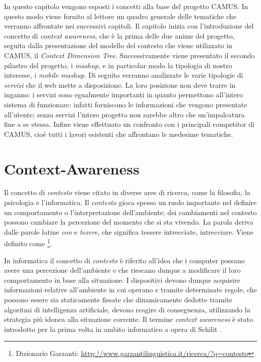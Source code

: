 In questo capitolo vengono esposti i concetti alla base del progetto CAMUS. In questo modo viene fornito al lettore un quadro generale delle tematiche che verranno affrontate nei successivi capitoli. Il capitolo inizia con l'introduzione del concetto di \emph{context awareness}, che è la prima delle due anime del progetto, seguita dalla presentazione del modello del contesto che viene utilizzato in CAMUS, il \emph{Context Dimension Tree}. Successivamente viene presentato il secondo pilastro del progetto, i \emph{mashup}, e in particolar modo la tipologia di nostro interesse, i \emph{mobile mashup}. Di seguito verranno analizzate le varie tipologie di \emph{servizi} che il web mette a disposizione. La loro posizione non deve trarre in inganno: i servizi sono egualmente importanti in quanto permettono all'intero sistema di funzionare: infatti forniscono le informazioni che vengono presentate all'utente; senza servizi l'intero progetto non sarebbe altro che un'impalcatura fine a se stessa. Infine viene effettuato un confronto con i principali competitor di CAMUS, cioè tutti i lavori esistenti che affrontano le medesime tematiche.

\section{Context-Awareness\label{sec:context-awareness}}

Il concetto di \emph{contesto} viene citato in diverse aree di ricerca, come la filosofia, la psicologia e l'informatica. Il \emph{contesto} gioca spesso un ruolo importante nel definire un comportamento o l'interpretazione dell'ambiente; dei cambiamenti nel contesto possono cambiare la percezione del momento che si sta vivendo. La parola  deriva dalle parole latine \emph{con} e \emph{texere}, che significa tessere intrecciate, intrecciare. Viene definito come \footnote{Dizionario Garzanti: \url{http://www.garzantilinguistica.it/ricerca/?q=contesto}}.

In informatica il concetto di \emph{contesto} è riferito all'idea che i computer possano avere una percezione dell'ambiente e che riescano dunque a modificare il loro comportamento in base alla situazione. I dispositivi devono dunque acquisire informazioni relative all'ambiente in cui operano e tramite determinate regole, che possono essere sia staticamente fissate che dinamicamente dedotte tramite algoritmi di intelligenza artificiale, devono reagire di conseguenza, utilizzando la strategia più idonea alla situazione corrente. Il termine \emph{context awareness} è stato introdotto per la prima volta in ambito informatico a opera di Schilit \cite{schilit1994context}\cite{schilit1994disseminating}.

